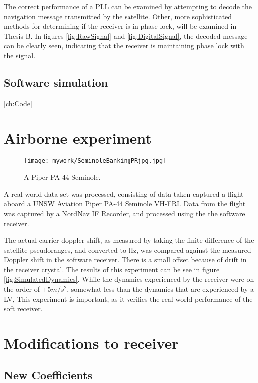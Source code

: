 The correct performance of a \ac{PLL} can be examined by attempting to decode the navigation message transmitted by the satellite. Other, more sophisticated methods for determining if the  receiver is in phase lock, will be examined in Thesis B. In figures \ref{fig:RawSignal} and \ref{fig:DigitalSignal}, the decoded message can be clearly seen, indicating that the receiver is maintaining phase lock with the signal.

\subsection{Software simulation}
\ref{ch:Code}

\section{Airborne experiment}

\begin{figure}[!htb] 
    \centering
    \texttt{[image: mywork/SeminoleBankingPRjpg.jpg]} 
    \caption{A Piper PA-44 Seminole.}
    \label{fig:PiperSeminole}
\end{figure}

A real-world data-set was processed, consisting of data taken captured a flight aboard a UNSW Aviation Piper PA-44 Seminole VH-FRI. Data from the flight was captured by a NordNav IF Recorder, and processed using the the software receiver. 

The actual carrier doppler shift, as measured by taking the finite difference of the satellite pseudoranges, and converted to Hz, was compared against the measured Doppler shift in the software receiver. There is a small offset because of drift in the receiver crystal. The results of this experiment can be see in figure \ref{fig:SimulatedDynamics}. While the dynamics experienced by the receiver were on the order of $\pm 5m/s^2$, somewhat less than the dynamics that are experienced by a \ac{LV}, This experiment is important, as it verifies the real world performance of the soft receiver. 

\section{Modifications to receiver}

\subsection{New Coefficients}


